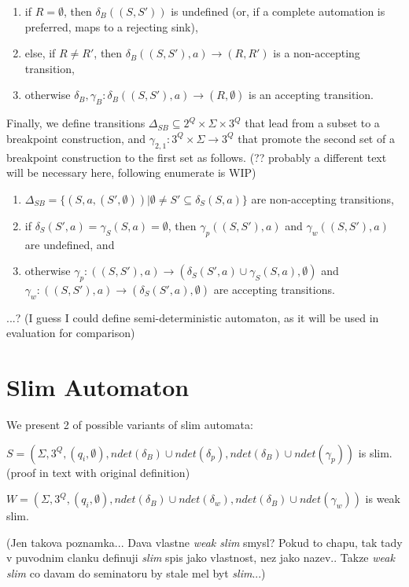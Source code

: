 \documentclass[
	digital
nolof, nolot
]{fithesis3}
\begin{document}
			\begin{enumerate}
				\item if $R=\emptyset$, then $\delta_B((S,S'))$ is undefined (or, if a complete automation is preferred, maps to a rejecting sink),
				\item else, if $R \neq R'$, then $\delta_B((S,S'),a)\rightarrow(R, R')$ is a non-accepting transition,
				\item otherwise $\delta_B, \gamma_B: \delta_B((S,S'),a)\rightarrow(R, \emptyset)$ is an accepting transition.
			\end{enumerate}
		
			Finally, we define transitions $\Delta_{SB}\subseteq 2^Q \times \Sigma \times 3^Q$ that lead from a subset to a breakpoint construction, and $\gamma_{2,1}:3^Q \times \Sigma \rightarrow 3^Q$ that promote the second set of a breakpoint construction to the first set as follows. (?? probably a different text will be necessary here, following enumerate is WIP)
			
			\begin{enumerate}
				\item $\Delta_{SB}=\{(S, a, (S', \emptyset)) | \emptyset \neq S' \subseteq \delta_S(S, a)\}$ are non-accepting transitions,
				\item if $\delta_S(S',a) = \gamma_S(S, a) = \emptyset$, then $\gamma_{p}((S,S'), a)$ and $\gamma_{w}((S,S'), a)$ are undefined, and
				\item otherwise
				 $\gamma_{p}:((S,S'),a)\rightarrow(\delta_S(S',a)\cup\gamma_S(S, a),\emptyset)$ and $\gamma_{w}:((S,S'),a)\rightarrow(\delta_S(S',a),\emptyset)$ are accepting transitions.
			\end{enumerate}
		
			...? (I guess I could define semi-deterministic automaton, as it will be used in evaluation for comparison)
			\section{Slim Automaton}
			We present 2 of possible variants of slim automata:
			
			$S=(\Sigma, 3^Q, (q_i,\emptyset), ndet(\delta_B)\cup ndet(\delta_{p}),ndet(\delta_B)\cup ndet(\gamma_{p}))$ is slim. (proof in text with original definition)
			
			$W=(\Sigma, 3^Q, (q_i,\emptyset), ndet(\delta_B)\cup ndet(\delta_{w}),ndet(\delta_B)\cup ndet(\gamma_{w}))$ is weak slim. 
			
			(Jen takova poznamka... Dava vlastne \emph{weak slim} smysl? Pokud to chapu, tak tady v puvodnim clanku definuji \emph{slim} spis jako vlastnost, nez jako nazev.. Takze \emph{weak slim} co davam do seminatoru by stale mel byt \emph{slim}...)
			
\end{document}
